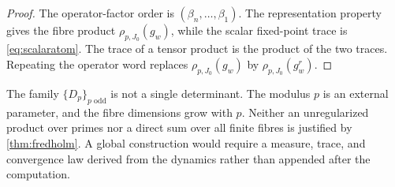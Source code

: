 \begin{proof}
The operator-factor order is
\((\beta_n,\ldots,\beta_1)\).  The representation property gives the fibre
product \(\rho_{p,J_0}(g_w)\), while the scalar fixed-point trace is
\cref{eq:scalaratom}.  The trace of a tensor product is the product of the
two traces.  Repeating the operator word replaces \(\rho_{p,J_0}(g_w)\) by
\(\rho_{p,J_0}(g_w^r)\).
\end{proof}

\begin{remark}
The family \(\{D_p\}_{p\text{ odd}}\) is not a single determinant.  The
modulus \(p\) is an external parameter, and the fibre dimensions grow with
\(p\).  Neither an unregularized product over primes nor a direct sum over
all finite fibres is justified by \cref{thm:fredholm}.  A global construction
would require a measure, trace, and convergence law derived from the dynamics
rather than appended after the computation.
\end{remark}
